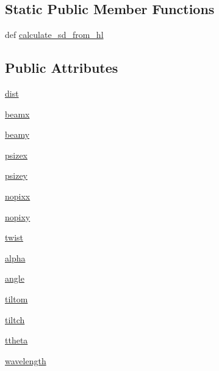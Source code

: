 \subsection*{Static Public Member Functions}
\begin{DoxyCompactItemize}
\item 
def \hyperlink{classmy_detector_1_1my_detector_af1fe29daf9b0c65bb59dbee747583619}{calculate\-\_\-sd\-\_\-from\-\_\-hl}
\end{DoxyCompactItemize}
\subsection*{Public Attributes}
\begin{DoxyCompactItemize}
\item 
\hyperlink{classmy_detector_1_1my_detector_a2246cf4b56f098e953bad790b34f668f}{dist}
\item 
\hyperlink{classmy_detector_1_1my_detector_ac7a646e99083103ff8ae1ae88755dbf8}{beamx}
\item 
\hyperlink{classmy_detector_1_1my_detector_a1a4c1ea459d9cb1d299af5a37484974f}{beamy}
\item 
\hyperlink{classmy_detector_1_1my_detector_aee1c732a56fbddef76f8b8b654d8b67a}{psizex}
\item 
\hyperlink{classmy_detector_1_1my_detector_ac4bb2831ee384d8f59c2ccabf72927f1}{psizey}
\item 
\hyperlink{classmy_detector_1_1my_detector_ae7c12b4ce74cc80a85dae3843f8b764c}{nopixx}
\item 
\hyperlink{classmy_detector_1_1my_detector_a3e60d490ee58d6c5d8ccb7a7a7f24c2e}{nopixy}
\item 
\hyperlink{classmy_detector_1_1my_detector_a339da3a9ba68962c6acd24de484c4c36}{twist}
\item 
\hyperlink{classmy_detector_1_1my_detector_a1c5fb06d769d966ed7fa68b1281b6c6b}{alpha}
\item 
\hyperlink{classmy_detector_1_1my_detector_a950f054dd5d673bb9e005999ef3c1194}{angle}
\item 
\hyperlink{classmy_detector_1_1my_detector_a6c9f97cb6f39f36a0abc0eb938f4270b}{tiltom}
\item 
\hyperlink{classmy_detector_1_1my_detector_aad991ce64666053ea938c784cb2f9783}{tiltch}
\item 
\hyperlink{classmy_detector_1_1my_detector_a9fa295f86db4b7e509856d87f4181cb0}{ttheta}
\item 
\hyperlink{classmy_detector_1_1my_detector_a72cda77b7147f0d187e6540d8c6cb5c2}{wavelength}

\end{DoxyCompactItemize}
